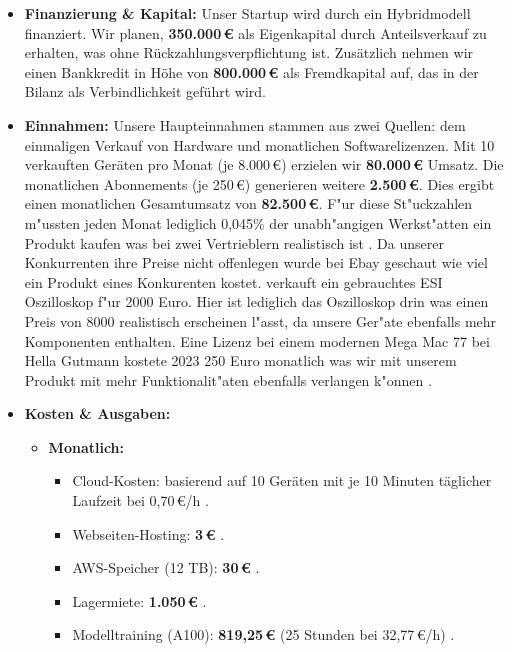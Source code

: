 \begin{itemize}
    \item \textbf{Finanzierung \& Kapital:} Unser Startup wird durch ein Hybridmodell finanziert. Wir planen, \textbf{350.000\,€} als Eigenkapital durch Anteilsverkauf zu erhalten, was ohne R\"uckzahlungsverpflichtung ist. Zusätzlich nehmen wir einen Bankkredit in H\"ohe von \textbf{800.000\,€} als Fremdkapital auf, das in der Bilanz als Verbindlichkeit gef\"uhrt wird.
    \item \textbf{Einnahmen:} Unsere Haupteinnahmen stammen aus zwei Quellen: dem einmaligen Verkauf von Hardware und monatlichen Softwarelizenzen. Mit 10 verkauften Ger\"aten pro Monat (je 8.000\,€) erzielen wir \textbf{80.000\,€} Umsatz. Die monatlichen Abonnements (je 250\,€) generieren weitere \textbf{2.500\,€}. Dies ergibt einen monatlichen Gesamtumsatz von \textbf{82.500\,€}. F"ur diese St"uckzahlen m"ussten jeden Monat lediglich 0,045\% der unabh"angigen Werkst"atten ein Produkt kaufen was bei zwei Vertrieblern realistisch ist \citep{zdk_2025}. Da unserer Konkurrenten ihre Preise nicht offenlegen wurde bei Ebay geschaut wie viel ein Produkt eines Konkurenten kostet. \citep{eBay_Eintrag_2025} verkauft ein gebrauchtes ESI Oszilloskop f"ur 2000 Euro. Hier ist lediglich das Oszilloskop drin was einen Preis von 8000 realistisch erscheinen l"asst, da unsere Ger"ate ebenfalls mehr Komponenten enthalten. Eine Lizenz bei einem modernen Mega Mac 77 bei Hella Gutmann kostete 2023 250 Euro monatlich was wir mit unserem Produkt mit mehr Funktionalit"aten ebenfalls verlangen k"onnen \citep{hella-gutmann_preisliste_2023}.
    \item \textbf{Kosten \& Ausgaben:}
    \begin{itemize}
        \item \textbf{Monatlich:}
        \begin{itemize}
            \item Cloud-Kosten: basierend auf 10 Ger\"aten mit je 10 Minuten t\"aglicher Laufzeit bei 0,70\,€/h \citep{getdeploying_nvidial4_gpu_2025}.
            \item Webseiten-Hosting: \textbf{3\,€} \citep{aws_faq_static_website_2025}.
            \item AWS-Speicher (12 TB): \textbf{30\,€} \citep{aws_s3_pricing_2025}.
            \item Lagermiete: \textbf{1.050\,€} \citep{kleinanzeigen_lagerflaeche_2025}.
            \item Modelltraining (A100): \textbf{819,25\,€} (25 Stunden bei 32,77\,€/h) \citep{datacrunch_gpu_pricing_2025}.

\end{itemize}
\end{itemize}
\end{itemize}
